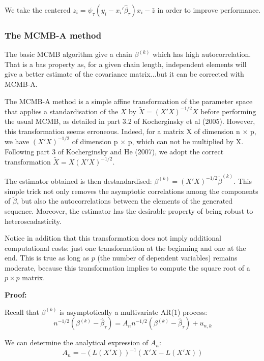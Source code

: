 \documentclass[11pt]{article}
\begin{document}
We take the centered $z_{i}=\psi_{\tau}(y_{i}-x_{i}'\hat{\beta}_{\tau})x_{i}-\bar{z}$ in order to improve performance.





	\subsubsection{The MCMB-A method}

The basic MCMB algorithm give a chain $\beta^{(k)}$ which has high autocorrelation. That is a bas property as, for a given chain length, independent elements will give a better estimate of the covariance matrix...but it can be corrected with MCMB-A.\medskip

The MCMB-A method is a simple affine transformation of the parameter space that applies a standardisation of the $X$ by $\tilde{X}=(X'X)^{-1/2}X$ before performing the usual MCMB, as detailed in part 3.2 of Kocherginsky et al (2005). However, this transformation seems erroneous. Indeed, for a matrix X of dimension n $\times$ p, we have $(X'X)^{-1/2}$ of dimension p $\times$ p, which can not be multiplied by X. Following part 3 of Kocherginsky and He (2007), we adopt the correct transformation $\tilde{X}=X(X'X)^{-1/2}$.\smallskip

The estimator obtained is then destandardised: $\beta^{(k)}=(X'X)^{-1/2}\tilde{\beta}^{(k)}$. This simple trick not only removes the asymptotic correlations among the components of $\tilde{\beta}$, but also the autocorrelations between the elements of the generated sequence. Moreover, the estimator has the desirable property of being robust to heteroscadasticity.\smallskip

Notice in addition that this transformation does not imply additional computational costs: just one transformation at the beginning and one at the end. This is true as long as $p$ (the number of dependent variables) remains moderate, because this transformation implies to compute the square root of a $p\times p$ matrix.\medskip


\textbf{Proof:}

Recall that $\beta^{(k)}$ is asymptotically a multivariate AR(1) process:
\begin{equation}
n^{-1/2}(\beta^{(k)}-\hat{\beta}_{\tau}) = A_{n}n^{-1/2}(\beta^{(k)}-\hat{\beta}_{\tau}) + u_{n,k}
\end{equation}

We can determine the analytical expression of $A_{n}$:
\begin{equation}
A_{n} = -\left(L(X'X)\right)^{-1}\left(X'X-L(X'X)\right)
\end{equation}
\end{document}
